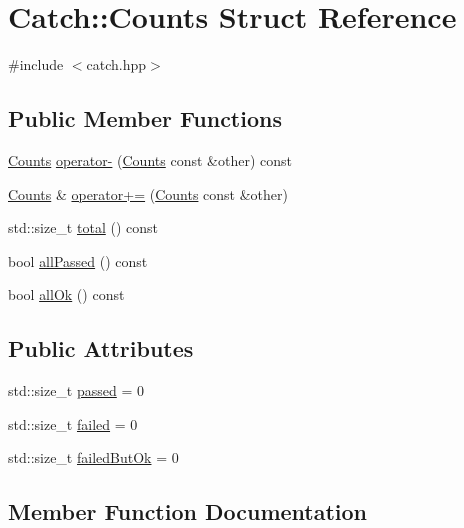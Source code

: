 \hypertarget{struct_catch_1_1_counts}{}\section{Catch\+:\+:Counts Struct Reference}
\label{struct_catch_1_1_counts}


{\ttfamily \#include $<$catch.\+hpp$>$}

\subsection*{Public Member Functions}
\begin{DoxyCompactItemize}
\item 
\mbox{\hyperlink{struct_catch_1_1_counts}{Counts}} \mbox{\hyperlink{struct_catch_1_1_counts_aaa10666f559057e3e860d2a5a6fae4c4}{operator-\/}} (\mbox{\hyperlink{struct_catch_1_1_counts}{Counts}} const \&other) const
\item 
\mbox{\hyperlink{struct_catch_1_1_counts}{Counts}} \& \mbox{\hyperlink{struct_catch_1_1_counts_a322a89475cd2cc039140ef371e973677}{operator+=}} (\mbox{\hyperlink{struct_catch_1_1_counts}{Counts}} const \&other)
\item 
std\+::size\+\_\+t \mbox{\hyperlink{struct_catch_1_1_counts_a94f969c09cf52d1339c085c9603cd1d3}{total}} () const
\item 
bool \mbox{\hyperlink{struct_catch_1_1_counts_a84999490e0ecaa3de5e121bf48eda1b3}{all\+Passed}} () const
\item 
bool \mbox{\hyperlink{struct_catch_1_1_counts_a33bd996e016030155b99fe1c51c08991}{all\+Ok}} () const
\end{DoxyCompactItemize}
\subsection*{Public Attributes}
\begin{DoxyCompactItemize}
\item 
std\+::size\+\_\+t \mbox{\hyperlink{struct_catch_1_1_counts_ad28daaf3de28006400208b6dd0c631e6}{passed}} = 0
\item 
std\+::size\+\_\+t \mbox{\hyperlink{struct_catch_1_1_counts_a19982a3817a3bc2c07f0290e71f497a3}{failed}} = 0
\item 
std\+::size\+\_\+t \mbox{\hyperlink{struct_catch_1_1_counts_ac090973a2ff51394cd452718e75c073e}{failed\+But\+Ok}} = 0
\end{DoxyCompactItemize}


\subsection{Member Function Documentation}
\mbox{\label{struct_catch_1_1_counts_a33bd996e016030155b99fe1c51c08991}} 
